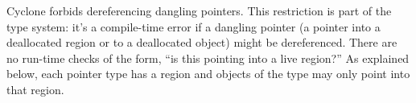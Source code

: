 
Cyclone forbids dereferencing dangling pointers.  This restriction is part of
the type system: it's a compile-time error if a dangling pointer (a pointer
into a deallocated region or to a deallocated object) might be dereferenced.
There are no run-time checks of the form, ``is this pointing into a live
region?''  As explained below, each pointer type has a region and objects of
the type may only point into that region.


